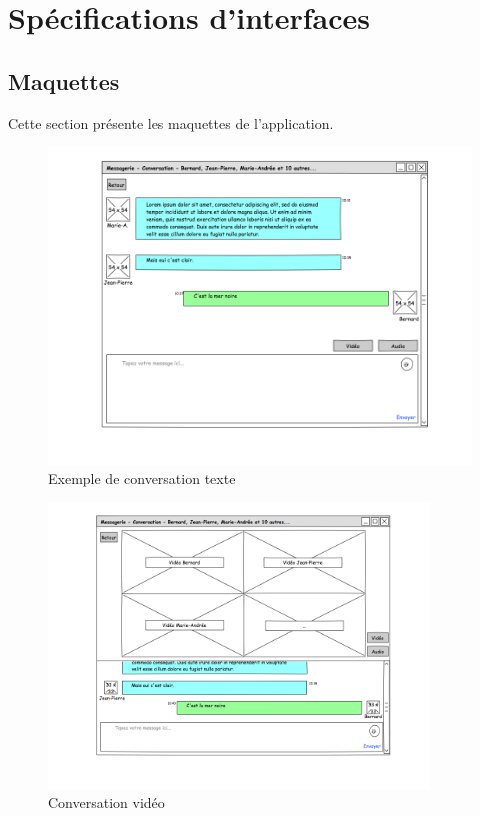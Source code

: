 \documentclass[11pt,dvipsnames,svgnames]{report}
\begin{document}
\section{Spécifications d'interfaces}
\subsection*{Maquettes}

Cette section présente les maquettes de l'application.

\begin{figure}[H]
\caption{Exemple de conversation texte}
\centerline{\includegraphics[width=.9\linewidth]{maquette/maquette1.png}}
\end{figure}

\begin{figure}[H]
\caption{Conversation vidéo}
\centerline{\includegraphics[width=0.9\textwidth]{maquette/maquette4.png}}
\end{figure}
\end{document}
